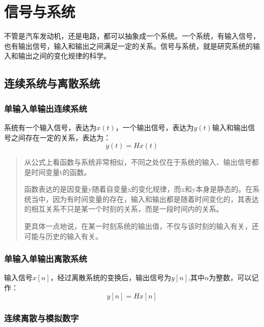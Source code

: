 \chapter{信号与系统}
不管是汽车发动机，还是电路，都可以抽象成一个系统。一个系统，有输入信号，也有输出信号，输入和输出之间满足一定的关系。信号与系统，就是研究系统的输入和输出之间的变化规律的科学。
\section{连续系统与离散系统}
\subsection{单输入单输出连续系统}
系统有一个输入信号，表达为$x(t)$，一个输出信号，表达为$y(t)$输入和输出信号之间存在一定的关系，表达为：
\begin{equation}
	y(t)=H{x(t)}
\end{equation}

\begin{quote}
	从公式上看函数与系统非常相似，不同之处仅在于系统的输入、输出信号都是时间变量t的函数。

	函数表达的是因变量y随着自变量x的变化规律，而x和y本身是静态的。在系统当中，因为有时间变量的存在，输入和输出都是随着时间变化的，其表达的相互关系不只是某一个时刻的关系，而是一段时间内的关系。

	更具体一点地说，在某一时刻系统的输出值，不仅与该时刻的输入有关，还可能与历史的输入有关。
\end{quote}


\subsection{单输入单输出离散系统}
输入信号$x[n]$，经过离散系统的变换后，输出信号为$y[n]$,其中$n$为整数，可以记作：
\begin{equation}
	y[n]=H{x[n]}
\end{equation}

\subsection{连续离散与模拟数字}

